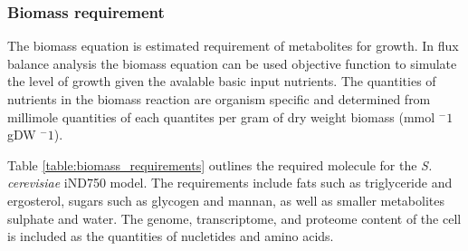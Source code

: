 \subsubsection{Biomass requirement}

The biomass equation is estimated requirement of metabolites for growth. In flux balance analysis the biomass equation can be used objective function to simulate the level of growth given the avalable basic input nutrients. The quantities of nutrients in the biomass reaction are organism specific and determined from millimole quantities of each quantites per gram of dry weight biomass (mmol $^-1$ gDW $^-1$).
 
Table \vref{table:biomass_requirements} outlines the required molecule for the \emph{S. cerevisiae} iND750 model. The requirements include fats such as triglyceride and ergosterol, sugars such as glycogen and mannan, as well as smaller metabolites sulphate and water. The genome, transcriptome, and proteome content of the cell is included as the quantities of nucletides and amino acids.

